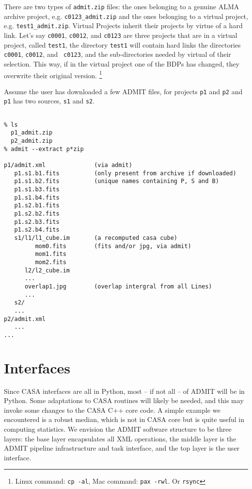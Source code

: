 \documentclass{article}
\begin{document}
There are two types of {\tt admit.zip} files: the ones belonging to
a genuine ALMA archive project, e.g.  {\tt c0123\_admit.zip} and the
ones belonging to a virtual project, e.g.  {\tt test1\_admit.zip}.
Virtual Projects inherit their projects by virtue of a hard link. Let's
say {\tt c0001}, {\tt c0012}, and {\tt c0123} are three projects that are
in a virtual project, called {\tt test1}, the directory {\tt test1} will
contain hard links the directories {\tt c0001}, {\tt c0012}, and {\tt
c0123}, and the sub-directories needed by virtual of their selection.
This way, if in the virtual project one of the BDPs has changed, they
overwrite their original version.
\footnote{Linux command: {\tt cp -al}, Mac command: {\tt pax -rwl}. Or {\tt rsync}}

Assume the user has downloaded a few ADMIT files, for projects {\tt p1}
and {\tt p2} and {\tt p1} has two sources, {\tt s1} and {\tt s2}.

\footnotesize
\begin{verbatim}

% ls
  p1_admit.zip
  p2_admit.zip
% admit --extract p*zip

p1/admit.xml              (via admit)
   p1.s1.b1.fits          (only present from archive if downloaded)
   p1.s1.b2.fits          (unique names containing P, S and B)
   p1.s1.b3.fits
   p1.s1.b4.fits
   p1.s2.b1.fits
   p1.s2.b2.fits
   p1.s2.b3.fits
   p1.s2.b4.fits
   s1/l1/l1_cube.im       (a recomputed casa cube)
         mom0.fits        (fits and/or jpg, via admit)
         mom1.fits
         mom2.fits
      l2/l2_cube.im
      ...
      overlap1.jpg        (overlap intergral from all Lines)
      ...
   s2/
   ...
p2/admit.xml
   ...
...

\end{verbatim}
\normalsize

\section{Interfaces}

Since CASA interfaces are all in Python, most -- if not all -- of ADMIT
will be in Python. Some adaptations to CASA routines will likely be
needed, and this may invoke some changes to the CASA C++ core code. A
simple example we encountered is a robust median, which is not in CASA
core but is quite useful in computing statistics.  We envision the ADMIT
software structure to be three layers: the base layer encapsulates
all XML operations, the middle layer is the ADMIT pipeline infrastructure and task
interface, and the top layer is the user interface.
\end{document}
